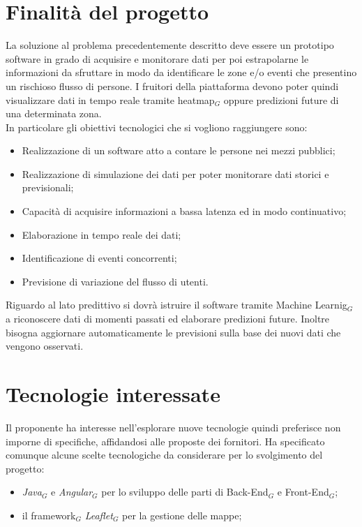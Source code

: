 \section{Finalità del progetto} \label{C3FinalitàDelProgetto}
La soluzione al problema precedentemente descritto deve essere un prototipo software in grado di acquisire e monitorare dati per poi estrapolarne le informazioni da sfruttare in modo da identificare le zone e/o  eventi che presentino un rischioso flusso di persone. I fruitori della piattaforma devono poter quindi visualizzare dati in tempo reale tramite heatmap$_G$ oppure predizioni future di una determinata zona. \\
In particolare gli obiettivi tecnologici che si vogliono raggiungere sono:
\begin{itemize}
	\item Realizzazione di un software atto a contare le persone nei mezzi pubblici;
	\item Realizzazione di simulazione dei dati per poter monitorare dati storici e previsionali;
	\item Capacità di acquisire informazioni a bassa latenza ed in modo continuativo;
	\item Elaborazione in tempo reale dei dati;
	\item Identificazione di eventi concorrenti;
	\item Previsione di variazione del flusso di utenti.
\end{itemize}
Riguardo al lato predittivo si dovrà istruire il software tramite Machine Learnig$_G$ a riconoscere dati di momenti passati ed elaborare predizioni future. Inoltre bisogna aggiornare automaticamente le previsioni sulla base dei nuovi dati che vengono osservati.
\section{Tecnologie interessate} \label{C3TecnologieInteressate}
Il proponente ha interesse nell'esplorare nuove tecnologie quindi preferisce non imporne di specifiche, affidandosi alle proposte dei fornitori. Ha specificato comunque alcune scelte tecnologiche da considerare per lo svolgimento del progetto:
\begin{itemize}
	\item \textit{Java}$_G$ e \textit{Angular}$_G$ per lo sviluppo delle parti di Back-End$_G$ e Front-End$_G$;
	\item il framework$_G$ \textit{Leaflet}$_G$ per la gestione delle mappe;
\end{itemize}
